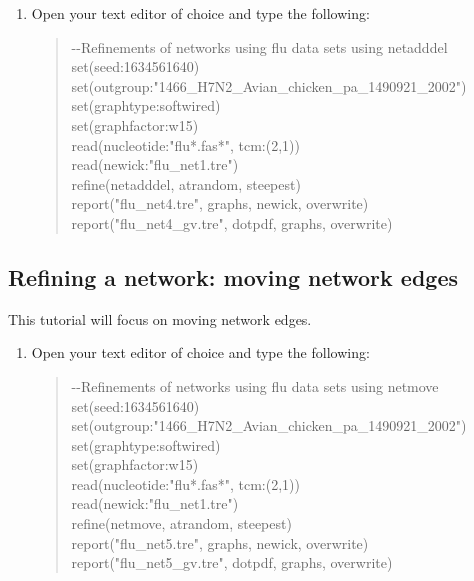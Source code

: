 \documentclass[11pt]{article}
\begin{document}
\begin {enumerate}

\item Open your text editor of choice and type the following:

	\begin{quote}	
	-\/-Refinements of networks using flu data sets using netadddel\\
	set(seed:1634561640)\\
	set(outgroup:"1466\_H7N2\_Avian\_chicken\_pa\_1490921\_2002")\\
	set(graphtype:softwired)\\
	set(graphfactor:w15)\\ 
	read(nucleotide:"flu*.fas*", tcm:(2,1))\\
	read(newick:"flu\_net1.tre")\\
	refine(netadddel, atrandom, steepest)\\
	report("flu\_net4.tre", graphs, newick, overwrite)\\
	report("flu\_net4\_gv.tre", dotpdf, graphs, overwrite)
	\end{quote}

\end{enumerate}
\subsection{Refining a network: moving network edges}
\label{subsec:netdel}

This tutorial will focus on moving network edges.

\begin {enumerate}

\item Open your text editor of choice and type the following:

	\begin{quote}	
	-\/-Refinements of networks using flu data sets using netmove\\
	set(seed:1634561640)\\
	set(outgroup:"1466\_H7N2\_Avian\_chicken\_pa\_1490921\_2002")\\
	set(graphtype:softwired)\\
	set(graphfactor:w15)\\ 
	read(nucleotide:"flu*.fas*", tcm:(2,1))\\
	read(newick:"flu\_net1.tre")\\
	refine(netmove, atrandom, steepest)\\
	report("flu\_net5.tre", graphs, newick, overwrite)\\
	report("flu\_net5\_gv.tre", dotpdf, graphs, overwrite)
	\end{quote}

\end{enumerate}


\end{document}
